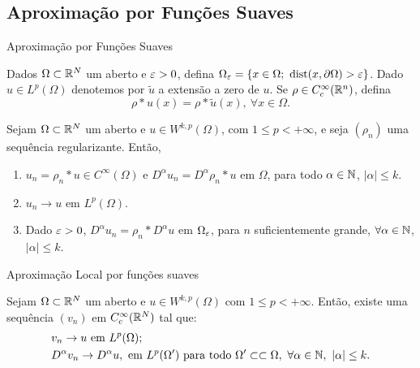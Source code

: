 \subsection*{Aproximação por Funções Suaves}

\begin{frame}{Aproximação por Funções Suaves}
	
Dados $\Omega\subset \mathbb{R}^N$ um aberto e {\color{red}$\varepsilon>0$}, defina {\color{red}$\Omega_\ep=\{x\in \Omega;\ \operatorname{dist}(x,\partial \Omega)>\ep\}$}. Dado $u\in L^p(\Omega)$ denotemos por $\tilde{u}$ a extensão a zero de $u$. Se $\rho\in C^\infty_c(\mathbb{R}^n)$, defina
\[\rho\ast u(x)=\rho\ast \tilde{u}(x),\ \forall x\in \Omega.\]

	
	\begin{prop}
		Sejam $\Omega \subset \mathbb{R}^N$ um aberto e $u\in W^{k,p}(\Omega)$, com $1\leq p<+\infty$, e seja $(\rho_n)$ uma sequência regularizante. Então,
		\begin{enumerate}
			\item 	$u_n=\rho_n\ast u \in C^\infty(\Omega)$ e $D^\alpha u_n=D^\alpha \rho_n\ast u$ em $\Omega$, para todo $\alpha\in \mathbb{N}$, $|\alpha|\leq k$.
			
			\item $u_n\to u$ em $L^p(\Omega)$.
			
			\item Dado $\varepsilon>0$, $D^\alpha u_n =\rho_n\ast D^\alpha u$ em $\Omega_\varepsilon$, para $n$ suficientemente grande,  $\forall \alpha\in \mathbb{N}$, $|\alpha|\leq k$.
		\end{enumerate}
	
	\end{prop}
	
\end{frame}

\begin{frame}{Aproximação Local por funções suaves}
\begin{teo}[Friedrichs]
	Sejam $\Omega \subset \mathbb{R}^N$ um aberto e $u\in W^{k,p}(\Omega)$ com $1\leq p<+\infty$. Então, existe uma sequência $(v_n)$ em $C^\infty_c(\mathbb{R}^N)$ tal que:
	\begin{equation*}
		\begin{split}
			&	v_n\to u \text{ em } L^p(\Omega);\\		
			&	D^\alpha v_n \to  D^\alpha u, \text{ em } L^p(\Omega') \text{ para todo } \Omega'\subset\subset \Omega,\  \forall \alpha\in \mathbb{N},\ |\alpha|\leq k. 
		\end{split}
	\end{equation*}
\end{teo}


\end{frame}


